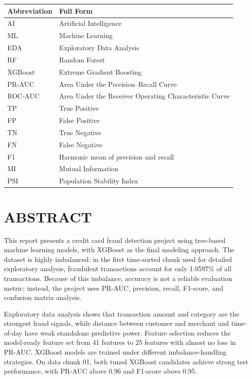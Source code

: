 \documentclass[12pt,a4paper]{article}
\newcommand{\frontsection}[1]{%
    \section*{\centering #1}%
    \addcontentsline{toc}{section}{#1}%
}
\begin{document}
\begin{table}[H]
\centering
\begin{tabular}{ll}
\toprule
\textbf{Abbreviation} & \textbf{Full Form} \\
\midrule
AI & Artificial Intelligence \\
ML & Machine Learning \\
EDA & Exploratory Data Analysis \\
RF & Random Forest \\
XGBoost & Extreme Gradient Boosting \\
PR-AUC & Area Under the Precision--Recall Curve \\
ROC-AUC & Area Under the Receiver Operating Characteristic Curve \\
TP & True Positive \\
FP & False Positive \\
TN & True Negative \\
FN & False Negative \\
F1 & Harmonic mean of precision and recall \\
MI & Mutual Information \\
PSI & Population Stability Index \\
\bottomrule
\end{tabular}
\end{table}

\newpage

\frontsection{ABSTRACT}

This report presents a credit card fraud detection project using tree-based machine learning models, with XGBoost as the final modeling approach. The dataset is highly imbalanced: in the first time-sorted chunk used for detailed exploratory analysis, fraudulent transactions account for only 1.0597\% of all transactions. Because of this imbalance, accuracy is not a reliable evaluation metric; instead, the project uses PR-AUC, precision, recall, F1-score, and confusion matrix analysis.

Exploratory data analysis shows that transaction amount and category are the strongest fraud signals, while distance between customer and merchant and time-of-day have weak standalone predictive power. Feature selection reduces the model-ready feature set from 41 features to 25 features with almost no loss in PR-AUC. XGBoost models are trained under different imbalance-handling strategies. On data chunk 01, both tuned XGBoost candidates achieve strong test performance, with PR-AUC above 0.96 and F1-score above 0.95.
\end{document}
